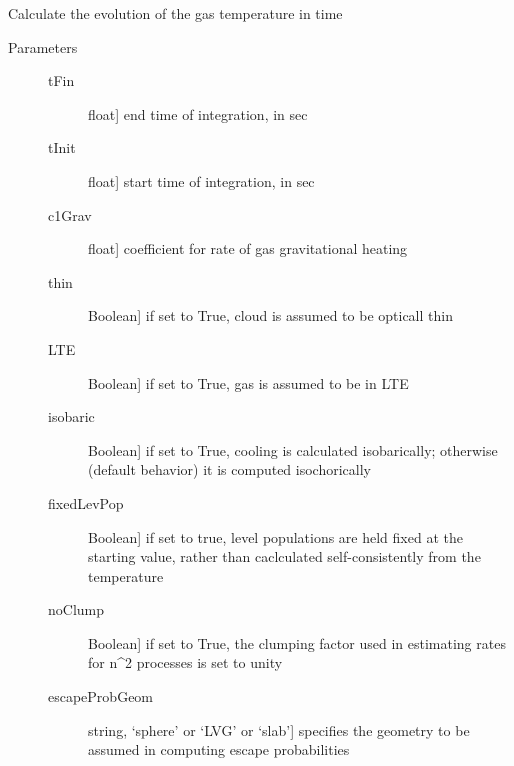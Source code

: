 \documentclass[letterpaper,10pt,english]{sphinxmanual}
\begin{document}
\begin{fulllineitems}
\begin{fulllineitems}
\begin{description}
\end{description}

\end{fulllineitems}


\begin{fulllineitems}
\label{fulldoc:despotic.cloud.tempEvol}
Calculate the evolution of the gas temperature in time
\begin{description}
\item[{Parameters}] \leavevmode\begin{description}
\item[{tFin}] \leavevmode{[}float{]}
end time of integration, in sec

\item[{tInit}] \leavevmode{[}float{]}
start time of integration, in sec

\item[{c1Grav}] \leavevmode{[}float{]}
coefficient for rate of gas gravitational heating

\item[{thin}] \leavevmode{[}Boolean{]}
if set to True, cloud is assumed to be opticall thin

\item[{LTE}] \leavevmode{[}Boolean{]}
if set to True, gas is assumed to be in LTE

\item[{isobaric}] \leavevmode{[}Boolean{]}
if set to True, cooling is calculated isobarically;
otherwise (default behavior) it is computed
isochorically

\item[{fixedLevPop}] \leavevmode{[}Boolean{]}
if set to true, level populations are held fixed
at the starting value, rather than caclculated
self-consistently from the temperature

\item[{noClump}] \leavevmode{[}Boolean{]}
if set to True, the clumping factor used in estimating
rates for n\textasciicircum{}2 processes is set to unity

\item[{escapeProbGeom}] \leavevmode{[}string, `sphere' or `LVG' or `slab'{]}
specifies the geometry to be assumed in computing escape
probabilities


\end{description}
\end{description}
\end{fulllineitems}
\end{fulllineitems}
\end{document}
